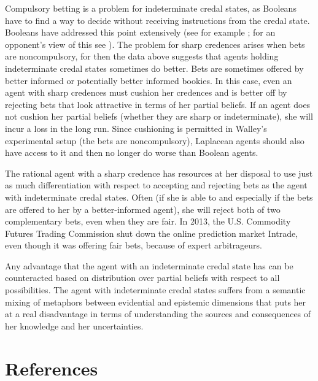 \documentclass[11pt]{article}
\begin{document}
Compulsory betting is a problem for indeterminate credal states, as
Booleans have to find a way to decide without receiving instructions
from the credal state. Booleans have addressed this point extensively
(see for example ; for an opponent's view of
this see ). The problem for sharp credences
arises when bets are noncompulsory, for then the data above suggests
that agents holding indeterminate credal states sometimes do better.
Bets are sometimes offered by better informed or potentially better
informed bookies. In this case, even an agent with sharp credences
must cushion her credences and is better off by rejecting bets that
look attractive in terms of her partial beliefs. If an agent does not
cushion her partial beliefs (whether they are sharp or indeterminate),
she will incur a loss in the long run. Since cushioning is permitted
in Walley's experimental setup (the bets are noncompulsory), Laplacean
agents should also have access to it and then no longer do worse than
Boolean agents.

The rational agent with a sharp credence has resources at her disposal
to use just as much differentiation with respect to accepting and
rejecting bets as the agent with indeterminate credal states. Often
(if she is able to and especially if the bets are offered to her by a
better-informed agent), she will reject both of two complementary
bets, even when they are fair. In 2013, the U.S. Commodity Futures
Trading Commission shut down the online prediction market Intrade,
even though it was offering fair bets, because of expert arbitrageurs.

Any advantage that the agent with an indeterminate credal state has
can be counteracted based on distribution over partial beliefs with
respect to all possibilities. The agent with indeterminate credal
states suffers from a semantic mixing of metaphors between evidential
and epistemic dimensions that puts her at a real disadvantage in terms
of understanding the sources and consequences of her knowledge and her
uncertainties.

\section{References} 
\label{References}

\nocite{boole54} 
\nocite{fraassen81} 
 

\end{document}
